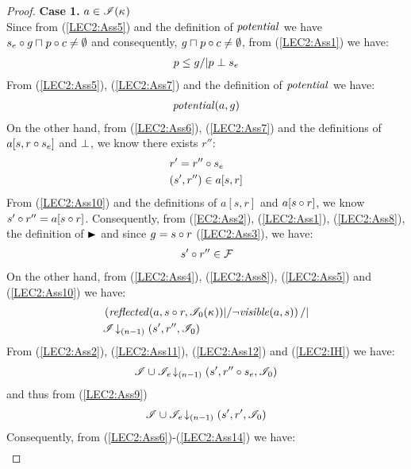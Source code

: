 \begin{lemma}
\begin{proof}
\noindent\textbf{Case 1. }$a \in \mathscr{I}(\kappa_{})$\\
Since from (\ref{LEC2:Ass5}) and the definition of $\mathit{potential}$ we have $s_e \circ g \sqcap_{} p \circ c \not= \emptyset$ and consequently, $g \sqcap_{} p \circ c \not= \emptyset$, from (\ref{LEC2:Ass1}) we have:
%
\begin{align}
	p \leq g /| p \mathrel{\bot} s_e \label{LEC2:Ass7}
\end{align}
% 
From (\ref{LEC2:Ass5}), (\ref{LEC2:Ass7}) and the definition of $\mathit{potential}$ we have:
%
\begin{align}
	\mathit{potential}(a, g) \label{LEC2:Ass8}
\end{align}
%
On the other hand, from (\ref{LEC2:Ass6}), (\ref{LEC2:Ass7}) and the definitions of $a[s, r \circ s_e]$ and $\mathrel{\bot}$, we know there exists $r''$: 
%
\begin{align}
	& r' = r'' \circ s_e \label{LEC2:Ass9}\\
	& (s', r'') \in a[s, r]  \label{LEC2:Ass10}
\end{align}
%
From (\ref{LEC2:Ass10}) and the definitions of $a[s, r]$ and $a[s \circ r]$, we know $s' \circ r'' = a[s \circ r]$. Consequently, from (\ref{EC2:Ass2}), (\ref{LEC2:Ass1}), (\ref{LEC2:Ass8}), the definition of $\strictfences$ and since $g = s \circ r$ (\ref{LEC2:Ass3}), we have:
%
\begin{align}
	s' \circ r'' \in \mathcal{F}_{}  \label{LEC2:Ass11}
\end{align}
On the other hand, from (\ref{LEC2:Ass4}), (\ref{LEC2:Ass8}), (\ref{LEC2:Ass5}) and (\ref{LEC2:Ass10}) we have:
%
\begin{align}
	& \left(\mathit{reflected}(a, s \circ r, \mathscr{I}_0(\kappa_{}) ) |/ \neg\mathit{visible}(a, s) \right) /| \label{LEC2:Ass12}\\
	& \mathscr{I} \!\downarrow_{(n-1)} \left(s', r'', \mathscr{I}_0\right) \label{LEC2:Ass13}
\end{align}
%
From (\ref{LEC2:Ass2}), (\ref{LEC2:Ass11}), (\ref{LEC2:Ass12}) and (\ref{LEC2:IH}) we have:
%
\begin{align*}
	\mathscr{I} \cup \mathscr{I}_{e} \!\downarrow_{(n-1)} \left(s', r'' \circ s_e, \mathscr{I}_0\right)
\end{align*}
%
and thus from (\ref{LEC2:Ass9})
%
\begin{align}
	\mathscr{I} \cup \mathscr{I}_{e} \!\downarrow_{(n-1)} \left(s', r', \mathscr{I}_0\right)
	\label{LEC2:Ass14}
\end{align}
%
Consequently, from (\ref{LEC2:Ass6})-(\ref{LEC2:Ass14}) we have:
%
\begin{align}

\end{align}
\end{proof}
\end{lemma}
